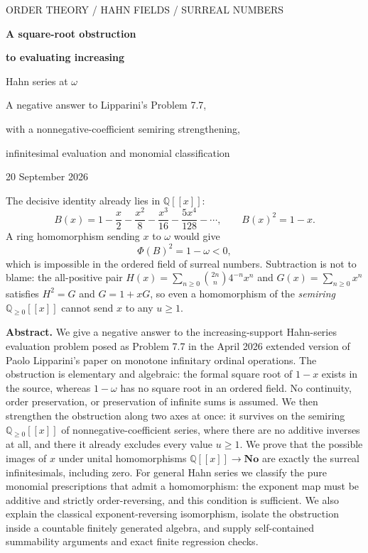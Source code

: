 \documentclass[11pt,letterpaper]{article}
\theoremstyle{definition}
\theoremstyle{remark}
\newcommand{\No}{\mathbf{No}}
\newcommand{\Q}{\mathbb Q}
\newcommand{\Qnn}{\Q_{\ge0}}
\begin{document}
\begin{titlepage}
\thispagestyle{empty}
\vspace*{0.05in}
{\color{OliveDark}\small\sffamily ORDER THEORY \; / \; HAHN FIELDS \; / \; SURREAL NUMBERS\par}
\vspace{0.28in}
{\Huge\bfseries A square-root obstruction\par}
\vspace{.12in}
{\LARGE\bfseries to evaluating increasing\par Hahn series at $\omega$\par}
\vspace{.28in}
{\large A negative answer to Lipparini's Problem 7.7,\par
with a nonnegative-coefficient semiring strengthening,\par
infinitesimal evaluation and monomial classification\par}
\vspace{.22in}
{\color{Quiet}20 September 2026\par}
\vspace{.2in}
\begin{resultbox}
The decisive identity already lies in $\Q[[x]]$:
\[
 B(x)=1-\frac{x}{2}-\frac{x^2}{8}-\frac{x^3}{16}-\frac{5x^4}{128}-\cdots,
 \qquad B(x)^2=1-x.
\]
A ring homomorphism sending $x$ to $\omega$ would give
\[
 \Phi(B)^2=1-\omega<0,
\]
which is impossible in the ordered field of surreal numbers.
Subtraction is not to blame: the all-positive pair
$H(x)=\sum_{n\ge0}\binom{2n}{n}4^{-n}x^n$ and $G(x)=\sum_{n\ge0}x^n$
satisfies $H^2=G$ and $G=1+xG$, so even a homomorphism of the
\emph{semiring} $\Qnn[[x]]$ cannot send $x$ to any $u\ge1$.
\end{resultbox}
\vspace{.25in}
\noindent\textbf{Abstract.}
We give a negative answer to the increasing-support Hahn-series evaluation problem
posed as Problem 7.7 in the April 2026 extended version of Paolo Lipparini's paper
on monotone infinitary ordinal operations. The obstruction is elementary and
algebraic: the formal square root of $1-x$ exists in the source, whereas $1-\omega$
has no square root in an ordered field. No continuity, order preservation, or
preservation of infinite sums is assumed. We then strengthen the obstruction
along two axes at once: it survives on the semiring $\Qnn[[x]]$ of
nonnegative-coefficient series, where there are no additive inverses at all,
and there it already excludes every value $u\ge1$. We prove that the possible
images of $x$ under unital homomorphisms $\Q[[x]]\to\No$ are exactly the surreal
infinitesimals, including zero. For general Hahn series we classify the pure
monomial prescriptions that admit a homomorphism: the exponent map must be
additive and strictly order-reversing, and this condition is sufficient. We also
explain the classical exponent-reversing isomorphism, isolate the obstruction
inside a countable finitely generated algebra, and supply self-contained
summability arguments and exact finite regression checks.


\end{titlepage}
\end{document}
